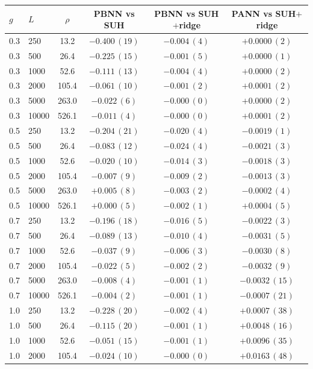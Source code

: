 \begin{tabular}{llcccc}
\hline\hline
$g$ & $L$ & $\rho$ & PBNN vs SUH & PBNN vs SUH$+$ridge & PANN vs SUH$+$ridge\\
\hline
0.3 & 250 & 13.2 & $-0.400\,(19)$ & $-0.004\,(4)$ & $+0.0000\,(2)$\\
0.3 & 500 & 26.4 & $-0.225\,(15)$ & $-0.001\,(5)$ & $+0.0000\,(1)$\\
0.3 & 1000 & 52.6 & $-0.111\,(13)$ & $-0.004\,(4)$ & $+0.0000\,(2)$\\
0.3 & 2000 & 105.4 & $-0.061\,(10)$ & $-0.001\,(2)$ & $+0.0001\,(2)$\\
0.3 & 5000 & 263.0 & $-0.022\,(6)$ & $-0.000\,(0)$ & $+0.0000\,(2)$\\
0.3 & 10000 & 526.1 & $-0.011\,(4)$ & $-0.000\,(0)$ & $+0.0001\,(2)$\\
0.5 & 250 & 13.2 & $-0.204\,(21)$ & $-0.020\,(4)$ & $-0.0019\,(1)$\\
0.5 & 500 & 26.4 & $-0.083\,(12)$ & $-0.024\,(4)$ & $-0.0021\,(3)$\\
0.5 & 1000 & 52.6 & $-0.020\,(10)$ & $-0.014\,(3)$ & $-0.0018\,(3)$\\
0.5 & 2000 & 105.4 & $-0.007\,(9)$ & $-0.009\,(2)$ & $-0.0013\,(3)$\\
0.5 & 5000 & 263.0 & $+0.005\,(8)$ & $-0.003\,(2)$ & $-0.0002\,(4)$\\
0.5 & 10000 & 526.1 & $+0.000\,(5)$ & $-0.002\,(1)$ & $+0.0004\,(5)$\\
0.7 & 250 & 13.2 & $-0.196\,(18)$ & $-0.016\,(5)$ & $-0.0022\,(3)$\\
0.7 & 500 & 26.4 & $-0.089\,(13)$ & $-0.010\,(4)$ & $-0.0031\,(5)$\\
0.7 & 1000 & 52.6 & $-0.037\,(9)$ & $-0.006\,(3)$ & $-0.0030\,(8)$\\
0.7 & 2000 & 105.4 & $-0.022\,(5)$ & $-0.002\,(2)$ & $-0.0032\,(9)$\\
0.7 & 5000 & 263.0 & $-0.008\,(4)$ & $-0.001\,(1)$ & $-0.0032\,(15)$\\
0.7 & 10000 & 526.1 & $-0.004\,(2)$ & $-0.001\,(1)$ & $-0.0007\,(21)$\\
1.0 & 250 & 13.2 & $-0.228\,(20)$ & $-0.002\,(4)$ & $+0.0007\,(38)$\\
1.0 & 500 & 26.4 & $-0.115\,(20)$ & $-0.001\,(1)$ & $+0.0048\,(16)$\\
1.0 & 1000 & 52.6 & $-0.051\,(15)$ & $-0.001\,(1)$ & $+0.0096\,(35)$\\
1.0 & 2000 & 105.4 & $-0.024\,(10)$ & $-0.000\,(0)$ & $+0.0163\,(48)$\\

\end{tabular}
